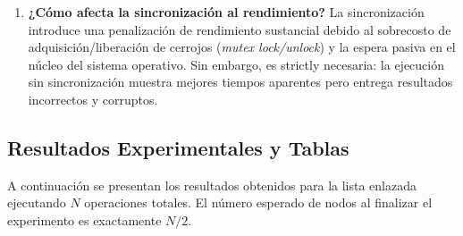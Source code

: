 \documentclass[11pt,a4paper]{article}
\begin{document}
\begin{enumerate}
    \item \textbf{¿Cómo afecta la sincronización al rendimiento?}
    La sincronización introduce una penalización de rendimiento sustancial debido al sobrecosto de adquisición/liberación de cerrojos (\textit{mutex lock/unlock}) y la espera pasiva en el núcleo del sistema operativo. Sin embargo, es strictly necesaria: la ejecución sin sincronización muestra mejores tiempos aparentes pero entrega resultados incorrectos y corruptos.
\end{enumerate}

\subsection{Resultados Experimentales y Tablas}

A continuación se presentan los resultados obtenidos para la lista enlazada ejecutando $N$ operaciones totales. El número esperado de nodos al finalizar el experimento es exactamente $N / 2$.
\end{document}
